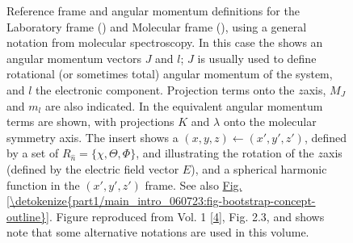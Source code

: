 \documentclass[letterpaper,table,10pt,english]{jupyterBook}
\begin{document}
\begin{figure}[htbp]
\centering
\capstart

\noindent{}
\caption{Reference frame and angular momentum definitions for the Laboratory frame ({\hyperref[\detokenize{backmatter/glossary:term-LF}]{}}) and Molecular frame ({\hyperref[\detokenize{backmatter/glossary:term-MF}]{}}), using a general notation from molecular spectroscopy. In this case the {\hyperref[\detokenize{backmatter/glossary:term-LF}]{}} shows an angular momentum vectors \(J\) and \(l\); \(J\) is usually used to define rotational (or sometimes total) angular momentum of the system, and \(l\) the electronic component. Projection terms onto the {\hyperref[\detokenize{backmatter/glossary:term-LF}]{}} \(z\)\sphinxhyphen{}axis, \(M_J\) and \(m_l\) are also indicated. In the {\hyperref[\detokenize{backmatter/glossary:term-MF}]{}} equivalent angular momentum terms are shown, with projections \(K\) and \(\lambda\) onto the molecular symmetry axis. The insert shows a {\hyperref[\detokenize{backmatter/glossary:term-frame-rotation}]{}} \((x,y,z)\leftarrow(x',y',z')\), defined by a set of {\hyperref[\detokenize{backmatter/glossary:term-Euler-angles}]{}} \(R_{\hat{n}}=\{\chi,\Theta,\Phi\}\), and illustrating the rotation of the \(z\)\sphinxhyphen{}axis (defined by the electric field vector \(E\)), and a spherical harmonic function in the \((x',y',z')\) frame. See also \hyperref[\detokenize{part1/main_intro_060723:fig-bootstrap-concept-outline}]{Fig.\@ \ref{\detokenize{part1/main_intro_060723:fig-bootstrap-concept-outline}}}. Figure reproduced from  Vol. 1 {[}\hyperlink{cite.backmatter/bibliography:id675}{4}{]}, Fig. 2.3, and shows  \sphinxhyphen{} note that some alternative notations are used in this volume.}\label{\detokenize{part1/theory_tensor_formalism_160723:fig-frame-defns}}\end{figure}
\end{document}
